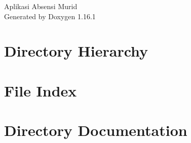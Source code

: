 \documentclass[twoside]{book}
\newcommand{\+}{\discretionary{\mbox{\scriptsize$\hookleftarrow$}}{}{}}
\newcommand{\clearemptydoublepage}{%
    \newpage{\pagestyle{empty}\cleardoublepage}%
  }
\begin{document}
  \raggedbottom
    \hypersetup{pageanchor=false,
                bookmarksnumbered=true,
                pdfencoding=unicode
               }
  \begin{titlepage}
  \vspace*{7cm}
  \begin{center}%
  {\Large Aplikasi Absensi Murid}\\
  \vspace*{1cm}
  {\large Generated by Doxygen 1.16.1}\\
  \end{center}
  \end{titlepage}
  \clearemptydoublepage
  \tableofcontents
  \clearemptydoublepage
  \hypersetup{pageanchor=true}
\chapter{Directory Hierarchy}

\chapter{File Index}

\chapter{Directory Documentation}












\end{document}
